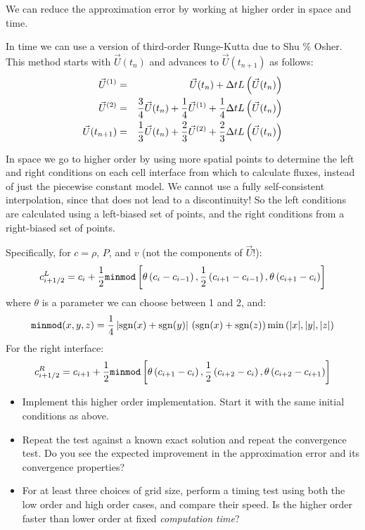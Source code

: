 \documentclass[11pt, preprint]{aastex}
\begin{document}
We can reduce the approximation error by working at higher order
in space and time.

In time we can use a version of third-order Runge-Kutta due to Shu \%
Osher. This method starts with $\vec{U}(t_n)$ and advances to
$\vec{U}(t_{n+1})$ as follows:
\begin{eqnarray}
\vec{U}^{(1)} &=& \vec{U}(t_n) + \Delta t L\left(\vec{U}(t_n)\right)
\cr
\vec{U}^{(2)} &=& \frac{3}{4} \vec{U}(t_n) + \frac{1}{4} \vec{U}^{(1)}
+ \frac{1}{4} \Delta t L\left(\vec{U}(t_n)\right)\cr
\vec{U}(t_{n+1}) &=& \frac{1}{3} \vec{U}(t_n) + \frac{2}{3} \vec{U}^{(2)}
+ \frac{2}{3} \Delta t L\left(\vec{U}(t_n)\right)
\end{eqnarray}

In space we go to higher order by using more spatial points to
determine the left and right conditions on each cell interface from
which to calculate fluxes, instead of just the piecewise constant
model. We cannot use a fully self-consistent interpolation, since that
does not lead to a discontinuity! So the left conditions are
calculated using a left-biased set of points, and the right conditions
from a right-biased set of points.

Specifically, for $c= \rho$, $P$, and $v$ (not the components of
$\vec{U}$!):
\begin{equation}
  c_{i+1/2}^L = c_i + \frac{1}{2}
  {\tt minmod}\left[\theta \left(c_i - c_{i-1}\right),
  \frac{1}{2}\left(c_{i+1} - c_{i-1}\right), 
  \theta \left(c_{i+1} - c_{i}\right) \right] 
\end{equation}
where $\theta$ is a parameter we can choose between 1 and 2, and:
\begin{equation}
  {\tt minmod}(x, y, z) = \frac{1}{4}\left| {\rm sgn}(x) + {\rm
    sgn}(y) \right| \,
  \left( {\rm sgn}(x) + {\rm sgn}(z)\right) {\rm min}\left(|x|, |y|,
  |z|\right)
\end{equation}
For the right interface:
\begin{equation}
  c_{i+1/2}^R = c_{i+1} + \frac{1}{2}
  {\tt minmod}\left[\theta \left(c_{i+1} - c_{i}\right),
  \frac{1}{2}\left(c_{i+2} - c_{i}\right), 
  \theta \left(c_{i+2} - c_{i+1}\right) \right] 
\end{equation}

\begin{itemize}
\item Implement this higher order implementation. Start it with the
  same initial conditions as above.
\item Repeat the test against a known exact solution and repeat the
  convergence test. Do you see the expected improvement in the
  approximation error and its convergence properties?
\item For at least three choices of grid size, perform a timing test
  using both the low order and high order cases, and compare their
  speed. Is the higher order faster than lower order at fixed {\it
    computation time}?
\end{itemize}
\end{document}
